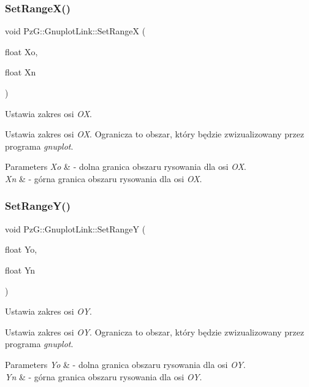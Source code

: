 \subsubsection{\texorpdfstring{Set\+Range\+X()}{SetRangeX()}}
{\footnotesize\ttfamily void Pz\+G\+::\+Gnuplot\+Link\+::\+Set\+RangeX (\begin{DoxyParamCaption}\item[{float}]{Xo,  }\item[{float}]{Xn }\end{DoxyParamCaption})\hspace{0.3cm}{\ttfamily [inline]}}



Ustawia zakres osi {\itshape OX}. 

Ustawia zakres osi {\itshape OX}. Ogranicza to obszar, który będzie zwizualizowany przez programa {\itshape gnuplot}. 
\begin{DoxyParams}{Parameters}
{\em Xo} & -\/ dolna granica obszaru rysowania dla osi {\itshape OX}. \\
\hline
{\em Xn} & -\/ górna granica obszaru rysowania dla osi {\itshape OX}. \\
\hline
\end{DoxyParams}
\mbox{\label{class_pz_g_1_1_gnuplot_link_a269f721e7d49c37a842c1f65511a7d71}} 
\subsubsection{\texorpdfstring{Set\+Range\+Y()}{SetRangeY()}}
{\footnotesize\ttfamily void Pz\+G\+::\+Gnuplot\+Link\+::\+Set\+RangeY (\begin{DoxyParamCaption}\item[{float}]{Yo,  }\item[{float}]{Yn }\end{DoxyParamCaption})\hspace{0.3cm}{\ttfamily [inline]}}



Ustawia zakres osi {\itshape OY}. 

Ustawia zakres osi {\itshape OY}. Ogranicza to obszar, który będzie zwizualizowany przez programa {\itshape gnuplot}. 
\begin{DoxyParams}{Parameters}
{\em Yo} & -\/ dolna granica obszaru rysowania dla osi {\itshape OY}. \\
\hline
{\em Yn} & -\/ górna granica obszaru rysowania dla osi {\itshape OY}. \\
\hline
\end{DoxyParams}
\mbox{\label{class_pz_g_1_1_gnuplot_link_a6cb4123fb2cbe459a747c2a1c1f94770}} 
